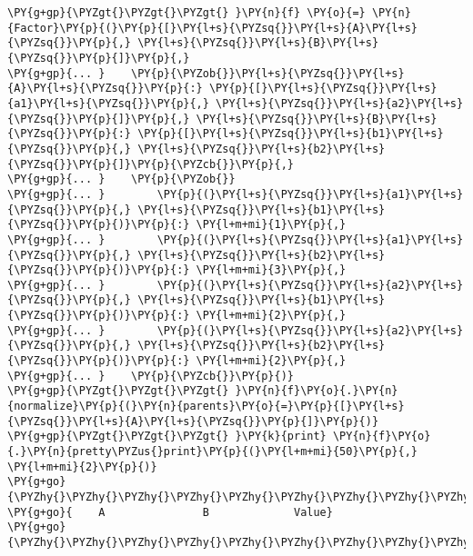 \begin{fulllineitems}
\begin{fulllineitems}
\begin{Verbatim}[commandchars=\\\{\}]
\PY{g+gp}{\PYZgt{}\PYZgt{}\PYZgt{} }\PY{n}{f} \PY{o}{=} \PY{n}{Factor}\PY{p}{(}\PY{p}{[}\PY{l+s}{\PYZsq{}}\PY{l+s}{A}\PY{l+s}{\PYZsq{}}\PY{p}{,} \PY{l+s}{\PYZsq{}}\PY{l+s}{B}\PY{l+s}{\PYZsq{}}\PY{p}{]}\PY{p}{,}
\PY{g+gp}{... }    \PY{p}{\PYZob{}}\PY{l+s}{\PYZsq{}}\PY{l+s}{A}\PY{l+s}{\PYZsq{}}\PY{p}{:} \PY{p}{[}\PY{l+s}{\PYZsq{}}\PY{l+s}{a1}\PY{l+s}{\PYZsq{}}\PY{p}{,} \PY{l+s}{\PYZsq{}}\PY{l+s}{a2}\PY{l+s}{\PYZsq{}}\PY{p}{]}\PY{p}{,} \PY{l+s}{\PYZsq{}}\PY{l+s}{B}\PY{l+s}{\PYZsq{}}\PY{p}{:} \PY{p}{[}\PY{l+s}{\PYZsq{}}\PY{l+s}{b1}\PY{l+s}{\PYZsq{}}\PY{p}{,} \PY{l+s}{\PYZsq{}}\PY{l+s}{b2}\PY{l+s}{\PYZsq{}}\PY{p}{]}\PY{p}{\PYZcb{}}\PY{p}{,}
\PY{g+gp}{... }    \PY{p}{\PYZob{}}
\PY{g+gp}{... }        \PY{p}{(}\PY{l+s}{\PYZsq{}}\PY{l+s}{a1}\PY{l+s}{\PYZsq{}}\PY{p}{,} \PY{l+s}{\PYZsq{}}\PY{l+s}{b1}\PY{l+s}{\PYZsq{}}\PY{p}{)}\PY{p}{:} \PY{l+m+mi}{1}\PY{p}{,}
\PY{g+gp}{... }        \PY{p}{(}\PY{l+s}{\PYZsq{}}\PY{l+s}{a1}\PY{l+s}{\PYZsq{}}\PY{p}{,} \PY{l+s}{\PYZsq{}}\PY{l+s}{b2}\PY{l+s}{\PYZsq{}}\PY{p}{)}\PY{p}{:} \PY{l+m+mi}{3}\PY{p}{,}
\PY{g+gp}{... }        \PY{p}{(}\PY{l+s}{\PYZsq{}}\PY{l+s}{a2}\PY{l+s}{\PYZsq{}}\PY{p}{,} \PY{l+s}{\PYZsq{}}\PY{l+s}{b1}\PY{l+s}{\PYZsq{}}\PY{p}{)}\PY{p}{:} \PY{l+m+mi}{2}\PY{p}{,}
\PY{g+gp}{... }        \PY{p}{(}\PY{l+s}{\PYZsq{}}\PY{l+s}{a2}\PY{l+s}{\PYZsq{}}\PY{p}{,} \PY{l+s}{\PYZsq{}}\PY{l+s}{b2}\PY{l+s}{\PYZsq{}}\PY{p}{)}\PY{p}{:} \PY{l+m+mi}{2}\PY{p}{,}
\PY{g+gp}{... }    \PY{p}{\PYZcb{}}\PY{p}{)}
\PY{g+gp}{\PYZgt{}\PYZgt{}\PYZgt{} }\PY{n}{f}\PY{o}{.}\PY{n}{normalize}\PY{p}{(}\PY{n}{parents}\PY{o}{=}\PY{p}{[}\PY{l+s}{\PYZsq{}}\PY{l+s}{A}\PY{l+s}{\PYZsq{}}\PY{p}{]}\PY{p}{)}
\PY{g+gp}{\PYZgt{}\PYZgt{}\PYZgt{} }\PY{k}{print} \PY{n}{f}\PY{o}{.}\PY{n}{pretty\PYZus{}print}\PY{p}{(}\PY{l+m+mi}{50}\PY{p}{,} \PY{l+m+mi}{2}\PY{p}{)}
\PY{g+go}{\PYZhy{}\PYZhy{}\PYZhy{}\PYZhy{}\PYZhy{}\PYZhy{}\PYZhy{}\PYZhy{}\PYZhy{}\PYZhy{}\PYZhy{}\PYZhy{}\PYZhy{}\PYZhy{}\PYZhy{}\PYZhy{}\PYZhy{}\PYZhy{}\PYZhy{}\PYZhy{}\PYZhy{}\PYZhy{}\PYZhy{}\PYZhy{}\PYZhy{}\PYZhy{}\PYZhy{}\PYZhy{}\PYZhy{}\PYZhy{}\PYZhy{}\PYZhy{}\PYZhy{}\PYZhy{}\PYZhy{}\PYZhy{}\PYZhy{}\PYZhy{}\PYZhy{}\PYZhy{}\PYZhy{}\PYZhy{}\PYZhy{}\PYZhy{}\PYZhy{}\PYZhy{}\PYZhy{}\PYZhy{}\PYZhy{}\PYZhy{}}
\PY{g+go}{    A               B             Value}
\PY{g+go}{\PYZhy{}\PYZhy{}\PYZhy{}\PYZhy{}\PYZhy{}\PYZhy{}\PYZhy{}\PYZhy{}\PYZhy{}\PYZhy{}\PYZhy{}\PYZhy{}\PYZhy{}\PYZhy{}\PYZhy{}\PYZhy{}\PYZhy{}\PYZhy{}\PYZhy{}\PYZhy{}\PYZhy{}\PYZhy{}\PYZhy{}\PYZhy{}\PYZhy{}\PYZhy{}\PYZhy{}\PYZhy{}\PYZhy{}\PYZhy{}\PYZhy{}\PYZhy{}\PYZhy{}\PYZhy{}\PYZhy{}\PYZhy{}\PYZhy{}\PYZhy{}\PYZhy{}\PYZhy{}\PYZhy{}\PYZhy{}\PYZhy{}\PYZhy{}\PYZhy{}\PYZhy{}\PYZhy{}\PYZhy{}\PYZhy{}\PYZhy{}}

\end{Verbatim}
\end{fulllineitems}
\end{fulllineitems}

